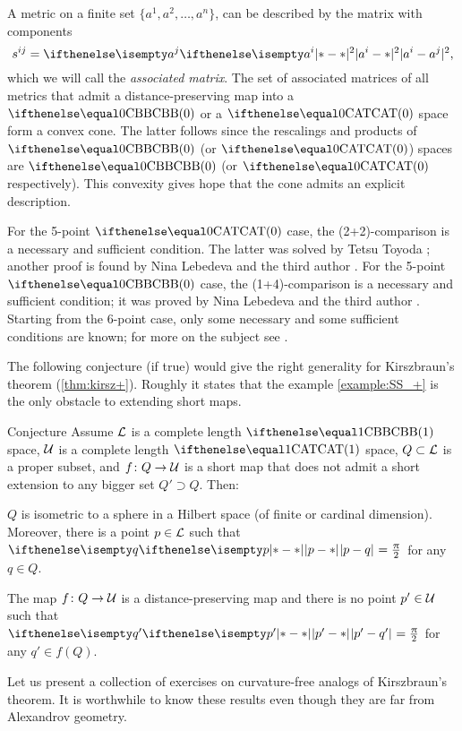 A metric on a finite set $\{a^1,a^2,\dots,a^n\}$,
can be described by the matrix with components
\[s^{ij}
=
\dist[2]{a^i}{a^j}{},\]
which we will call the \emph{associated matrix}.
The set of associated matrices of all metrics that admit a distance-preserving map into a $\Alex{0}$ or a $\CAT{0}$ space 
form a convex cone. 
The latter follows since the rescalings and products of $\Alex{0}$ (or $\CAT{0}$) spaces are  $\Alex{0}$ (or $\CAT{0}$ respectively).
This convexity gives hope that the cone admits an explicit description.

For the 5-point $\CAT{0}$ case, the (2+2)-comparison is a necessary and sufficient condition.
The latter was solved by Tetsu Toyoda \cite{toyoda};
another proof is found by Nina Lebedeva and the third author \cite{lebedeva-petrunin:toyoda}.
For the 5-point $\Alex{0}$ case, the (1+4)-comparison is a necessary and sufficient condition;
it was proved by Nina Lebedeva and the third author \cite{lebedeva-petrunin:5CBB}.
Starting from the 6-point case, only some necessary and some sufficient conditions are known;
for more on the subject see \cite{alexander-kapovitch-kirszbraun, lebedeva-petrunin:toyoda, lebedeva-petrunin-zolotov}.

The following conjecture (if true) would give the  right generality for Kirszbraun's theorem (\ref{thm:kirsz+}).
Roughly it states that the example \ref{example:SS_+} 
is the only obstacle to extending short maps.

\begin{thm}{Conjecture}\label{conj:kirsz}
Assume $\mathcal{L}$ is a complete length $\Alex1$ space,
$\mathcal{U}$ is a complete length $\CAT1$ space,
$Q\subset \spc{L}$ is a proper subset,
and $f\: Q\to\spc{U}$ is a short map that does not admit a short extension to any bigger set $Q'\supset Q$. 
Then: 

\begin{subthm}{}
$Q$ is isometric to a sphere in a Hilbert space (of finite or cardinal dimension).
Moreover, there is a point $p\in \spc{L}$ such that $\dist{p}{q}{}=\tfrac{\pi}{2}$ for any $q\in Q$.
\end{subthm}

\begin{subthm}{}
The map $f\:Q\to\spc{U}$ is a distance-preserving map and there is no point $p'\in \spc{U}$ such that $\dist{p'}{q'}{}=\tfrac{\pi}{2}$ for any $q'\in f(Q)$.
\end{subthm}
\end{thm}

Let us present a collection of exercises on curvature-free analogs of Kirszbraun's theorem.
It is worthwhile to know these results even though they are far from Alexandrov geometry.

